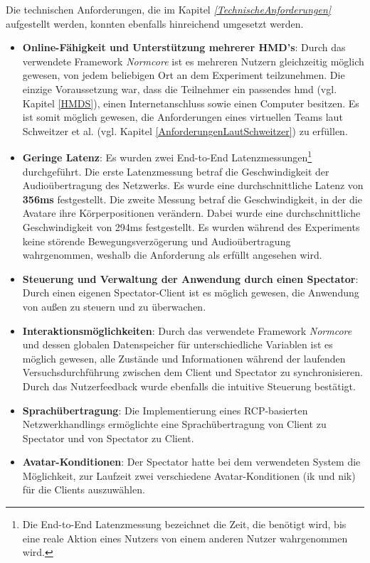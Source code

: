 \documentclass[a4paper,11pt]{article}%
\renewcommand{\\}{\vspace*{0.5\baselineskip} \newline}
\begin{document}
{{Die technischen Anforderungen, die im Kapitel \textit{\ref{TechnischeAnforderungen}} aufgestellt werden, konnten ebenfalls hinreichend umgesetzt werden.
\begin{itemize}
\item \textbf{Online-Fähigkeit und Unterstützung mehrerer HMD's}: Durch das verwendete Framework \textit{Normcore} ist es mehreren Nutzern gleichzeitig möglich gewesen, von jedem beliebigen Ort an dem Experiment teilzunehmen. Die einzige Voraussetzung war, dass die Teilnehmer ein passendes \ac{hmd} (vgl. Kapitel \ref{HMDS}), einen Internetanschluss sowie einen Computer besitzen. Es ist somit möglich gewesen, die Anforderungen eines virtuellen Teams laut Schweitzer et al. \citep[S. 270]{schweitzer2010conceptualizing} (vgl. Kapitel \ref{AnforderungenLautSchweitzer}) zu erfüllen. 
\item \textbf{Geringe Latenz}: Es wurden zwei End-to-End Latenzmessungen\footnote{Die End-to-End Latenzmessung bezeichnet die Zeit, die benötigt wird, bis eine reale Aktion eines Nutzers von einem anderen Nutzer wahrgenommen wird.} durchgeführt. Die erste Latenzmessung betraf die Geschwindigkeit der Audioübertragung des Netzwerks. Es wurde eine durchschnittliche Latenz von \textbf{356ms} festgestellt.
Die zweite Messung betraf die Geschwindigkeit, in der die Avatare ihre Körperpositionen verändern. Dabei wurde eine durchschnittliche Geschwindigkeit von 294ms festgestellt.
Es wurden während des Experiments keine störende Bewegungsverzögerung und Audioübertragung wahrgenommen, weshalb die Anforderung als erfüllt angesehen wird.
\item \textbf{Steuerung und Verwaltung der Anwendung durch einen Spectator}: Durch einen eigenen Spectator-Client ist es möglich gewesen, die Anwendung von außen zu steuern und zu überwachen.
\item \textbf{Interaktionsmöglichkeiten}:  Durch das verwendete Framework \textit{Normcore} und dessen globalen Datenspeicher für unterschiedliche Variablen ist es möglich gewesen, alle Zustände und Informationen während der laufenden Versuchsdurchführung zwischen dem Client und Spectator zu synchronisieren. Durch das Nutzerfeedback wurde ebenfalls die intuitive Steuerung bestätigt.
\item \textbf{Sprachübertragung}: Die Implementierung eines RCP-basierten Netzwerkhandlings ermöglichte eine Sprachübertragung von Client zu Spectator und von Spectator zu Client.
\item \textbf{Avatar-Konditionen}: Der Spectator hatte bei dem verwendeten System die Möglichkeit, zur Laufzeit zwei verschiedene Avatar-Konditionen (\ac{ik} und \ac{nik}) für die Clients auszuwählen.

\end{itemize}}}
\end{document}
